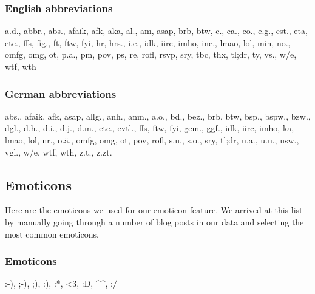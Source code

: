 \subsubsection{English abbreviations}
a.d., abbr., abs., afaik, afk, aka, al., am, asap, brb, btw, c., ca., co., e.g., est., eta, etc., ffs, fig., ft, ftw, fyi, hr, hrs., i.e., idk, iirc, imho, inc., lmao, lol, min, no., omfg, omg, ot, p.a., pm, pov, ps, re, rofl, rsvp, sry, tbc, thx, tl;dr, ty, vs., w/e, wtf, wth


\subsubsection{German abbreviations}
abs., afaik, afk, asap, allg., anh., anm., a.o., bd., bez., brb, btw, bsp., bspw., bzw., dgl., d.h., d.i., d.j., d.m., etc., evtl., ffs, ftw, fyi, gem., ggf., idk, iirc, imho, ka, lmao, lol, nr., o.ä., omfg, omg, ot, pov, rofl, s.u., s.o., sry, tl;dr, u.a., u.u., usw., vgl., w/e, wtf, wth, z.t., z.zt.

\subsection{Emoticons}
\label{sec:app_emoticons}
Here are the emoticons we used for our emoticon feature. We arrived at this list by manually going through a number of blog posts in our data and selecting the most common emoticons.


\subsubsection{Emoticons}
:-), ;-), ;), :), :*, <3, :D, \textasciicircum\textasciicircum, :$/$